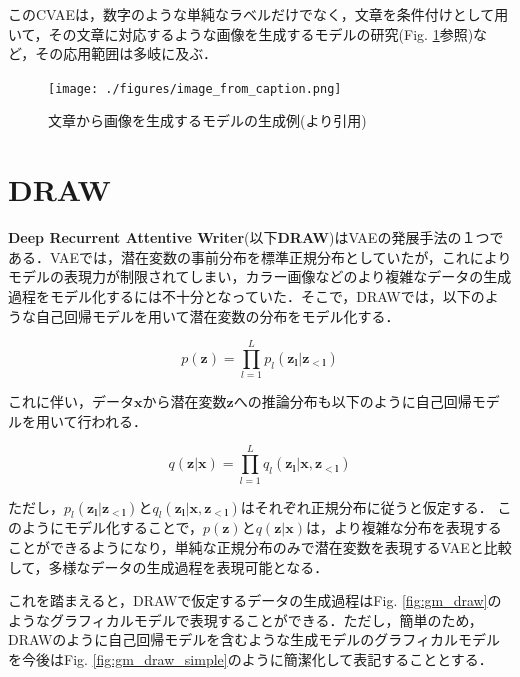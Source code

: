 このCVAEは，数字のような単純なラベルだけでなく，文章を条件付けとして用いて，その文章に対応するような画像を生成するモデルの研究(Fig. \ref{fig:image_from_caption}参照)\cite{Mansimov2015}など，その応用範囲は多岐に及ぶ\cite{Larsen2015}．

\begin{figure}[tbp]
  \begin{center}
    \texttt{[image: ./figures/image\_from\_caption.png]}
    \caption{文章から画像を生成するモデルの生成例(\cite{Mansimov2015}より引用)}
    \label{fig:image_from_caption}
  \end{center}
\end{figure}

\section{DRAW}
\label{section:DRAW}
{\bf Deep Recurrent Attentive Writer}(以下{\bf DRAW})\cite{Gregor2015, Gregor2016}はVAEの発展手法の１つである．VAEでは，潜在変数の事前分布を標準正規分布としていたが，これによりモデルの表現力が制限されてしまい，カラー画像などのより複雑なデータの生成過程をモデル化するには不十分となっていた．そこで，DRAWでは，以下のような自己回帰モデルを用いて潜在変数の分布をモデル化する．

\begin{equation}
p(\bm{z}) = \prod_{l=1}^{L}p_{l}(\bm{z_{l}}|\bm{z_{<l}}) \label{eq:pdraw}
\end{equation}

これに伴い，データ$\bm{x}$から潜在変数$\bm{z}$への推論分布も以下のように自己回帰モデルを用いて行われる．

\begin{equation}
q ( \bm{z} | \bm{x} ) = \prod _ { l = 1 } ^ { L } q _ { l }( \bm{z _ { l } } | \bm{x} , \bm{z _ { < l }}) \label{eq:qdraw}
\end{equation}

ただし，$p_l(\bm{z_l}|\bm{z_{<l}})$と$q_l(\bm{z_l}|\bm{x}, \bm{z_{<l}})$はそれぞれ正規分布に従うと仮定する．
このようにモデル化することで，$p(\bm{z})$と$q ( \bm{z} | \bm{x} )$は，より複雑な分布を表現することができるようになり，単純な正規分布のみで潜在変数を表現するVAEと比較して，多様なデータの生成過程を表現可能となる．

これを踏まえると，DRAWで仮定するデータの生成過程はFig. \ref{fig:gm_draw}のようなグラフィカルモデルで表現することができる．ただし，簡単のため，DRAWのように自己回帰モデルを含むような生成モデルのグラフィカルモデルを今後はFig. \ref{fig:gm_draw_simple}のように簡潔化して表記することとする．

